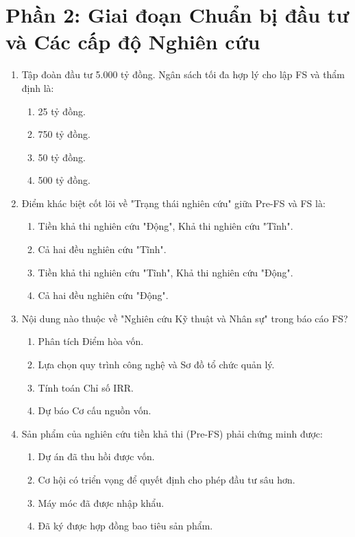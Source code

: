 \section{Phần 2: Giai đoạn Chuẩn bị đầu tư và Các cấp độ Nghiên cứu}

\begin{enumerate}[label=\textbf{Câu \arabic*:}, leftmargin=*, resume]

\item Tập đoàn đầu tư 5.000 tỷ đồng. Ngân sách tối đa hợp lý cho lập FS và thẩm định là:
\begin{enumerate}[label=\Alph*.]
    \item 25 tỷ đồng. \item 750 tỷ đồng. \item 50 tỷ đồng. \item 500 tỷ đồng.
\end{enumerate}

\item Điểm khác biệt cốt lõi về "Trạng thái nghiên cứu" giữa Pre-FS và FS là:
\begin{enumerate}[label=\Alph*.]
    \item Tiền khả thi nghiên cứu "Động", Khả thi nghiên cứu "Tĩnh".
    \item Cả hai đều nghiên cứu "Tĩnh".
    \item Tiền khả thi nghiên cứu "Tĩnh", Khả thi nghiên cứu "Động".
    \item Cả hai đều nghiên cứu "Động".
\end{enumerate}

\item Nội dung nào thuộc về "Nghiên cứu Kỹ thuật và Nhân sự" trong báo cáo FS?
\begin{enumerate}[label=\Alph*.]
    \item Phân tích Điểm hòa vốn.
    \item Lựa chọn quy trình công nghệ và Sơ đồ tổ chức quản lý.
    \item Tính toán Chỉ số IRR.
    \item Dự báo Cơ cấu nguồn vốn.
\end{enumerate}

\item Sản phẩm của nghiên cứu tiền khả thi (Pre-FS) phải chứng minh được:
\begin{enumerate}[label=\Alph*.]
    \item Dự án đã thu hồi được vốn.
    \item Cơ hội có triển vọng để quyết định cho phép đầu tư sâu hơn.
    \item Máy móc đã được nhập khẩu.
    \item Đã ký được hợp đồng bao tiêu sản phẩm.
\end{enumerate}


\end{enumerate}
